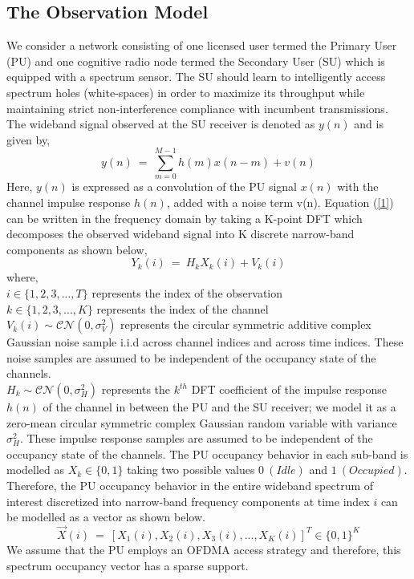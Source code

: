 \documentclass[conference]{IEEEtran}
\begin{document}
\subsection{The Observation Model}
We consider a network consisting of one licensed user termed the Primary User (PU) and one cognitive radio node termed the Secondary User (SU) which is equipped with a spectrum sensor. The SU should learn to intelligently access spectrum holes (white-spaces) in order to maximize its throughput while maintaining strict non-interference compliance with incumbent transmissions. The wideband signal observed at the SU receiver is denoted as $y(n)$ and is given by,
\begin{equation}\label{1}
    y(n)\ =\ \sum_{m=0}^{M-1} h(m)x(n-m) + v(n)
\end{equation}
Here, $y(n)$ is expressed as a convolution of the PU signal $x(n)$ with the channel impulse response $h(n)$, added with a noise term v(n).
Equation (\ref{1}) can be written in the frequency domain by taking a K-point DFT which decomposes the observed wideband signal into K discrete narrow-band components as shown below,
\begin{equation}\label{2}
    Y_k(i)\ =\ H_kX_k(i) + V_k(i)
\end{equation}
where,
\\$i \in \{1,2,3,...,T\}$ represents the index of the observation
\\$k \in \{1,2,3,...,K\}$ represents the index of the channel
\\$V_k(i) \sim \mathcal{CN}(0,\sigma_V^2)$ represents the circular symmetric additive complex Gaussian noise sample i.i.d across channel indices and across time indices. These noise samples are assumed to be independent of the occupancy state of the channels.
\\$H_k \sim \mathcal{CN}(0,\sigma_H^2)$ represents the $k^{th}$ DFT coefficient of the impulse response $h(n)$ of the channel in between the PU and the SU receiver; we model it as a zero-mean circular symmetric complex Gaussian random variable with variance $\sigma_H^2$. These impulse response samples are assumed to be independent of the occupancy state of the channels. The PU occupancy behavior in each sub-band is modelled as $X_k \in \{0,1\}$ taking two possible values $0\ (Idle)$ and $1\ (Occupied)$. Therefore, the PU occupancy behavior in the entire wideband spectrum of interest discretized into narrow-band frequency components at time index $i$ can be modelled as a vector as shown below.
\begin{equation}\label{3}
    \vec{X}(i)\ =\ [X_1(i),X_2(i),X_3(i),...,X_K(i)]^T \in \{0,1\}^K
\end{equation}
We assume that the PU employs an OFDMA access strategy and therefore, this spectrum occupancy vector has a sparse support.
\end{document}
